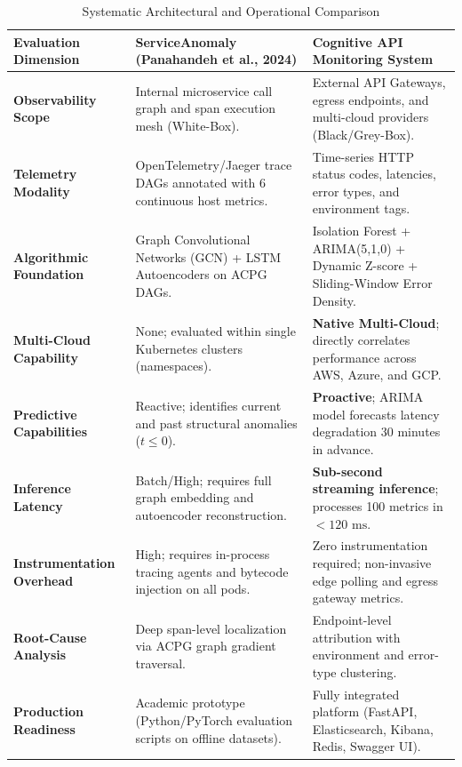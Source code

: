 \documentclass[11pt,a4paper]{article}
\begin{document}
\begin{table}[htbp]
\centering
\caption{Systematic Architectural and Operational Comparison}
\label{tab:comparison_matrix}
\footnotesize
\begin{tabularx}{\textwidth}{p{3.2cm}p{6.8cm}p{6.8cm}}
\toprule
\textbf{Evaluation Dimension} & \textbf{ServiceAnomaly (Panahandeh et al., 2024)} & \textbf{Cognitive API Monitoring System} \\
\midrule
\textbf{Observability Scope} & Internal microservice call graph and span execution mesh (White-Box). & External API Gateways, egress endpoints, and multi-cloud providers (Black/Grey-Box). \\
\addlinespace
\textbf{Telemetry Modality} & OpenTelemetry/Jaeger trace DAGs annotated with 6 continuous host metrics. & Time-series HTTP status codes, latencies, error types, and environment tags. \\
\addlinespace
\textbf{Algorithmic Foundation} & Graph Convolutional Networks (GCN) + LSTM Autoencoders on ACPG DAGs. & Isolation Forest + ARIMA(5,1,0) + Dynamic Z-score + Sliding-Window Error Density. \\
\addlinespace
\textbf{Multi-Cloud Capability} & None; evaluated within single Kubernetes clusters (namespaces). & \textbf{Native Multi-Cloud}; directly correlates performance across AWS, Azure, and GCP. \\
\addlinespace
\textbf{Predictive Capabilities} & Reactive; identifies current and past structural anomalies ($t \le 0$). & \textbf{Proactive}; ARIMA model forecasts latency degradation 30 minutes in advance. \\
\addlinespace
\textbf{Inference Latency} & Batch/High; requires full graph embedding and autoencoder reconstruction. & \textbf{Sub-second streaming inference}; processes 100 metrics in $< 120\text{ ms}$. \\
\addlinespace
\textbf{Instrumentation Overhead} & High; requires in-process tracing agents and bytecode injection on all pods. & Zero instrumentation required; non-invasive edge polling and egress gateway metrics. \\
\addlinespace
\textbf{Root-Cause Analysis} & Deep span-level localization via ACPG graph gradient traversal. & Endpoint-level attribution with environment and error-type clustering. \\
\addlinespace
\textbf{Production Readiness} & Academic prototype (Python/PyTorch evaluation scripts on offline datasets). & Fully integrated platform (FastAPI, Elasticsearch, Kibana, Redis, Swagger UI). \\
\bottomrule
\end{tabularx}
\end{table}
\end{document}
